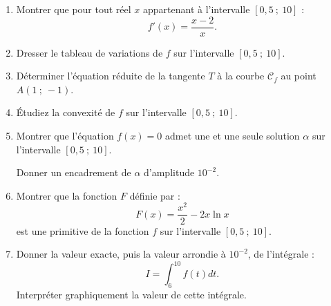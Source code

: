 \begin{enumerate}
     \item %
     Montrer que pour tout réel $x$ appartenant à l'intervalle $[0,5~;~10]$ :
     \[ f'(x) =\dfrac{x-2}{x}. \]
     \item %
     Dresser le tableau de variations de $f$ sur l'intervalle $[0,5~;~10]$.
     \item %
     Déterminer l'équation réduite de la tangente $T$ à la courbe $\mathscr{C}_f$ au point $A(1~;~-1)$.
     \item %
     \'Etudiez la convexité de $f$ sur l'intervalle $[0,5~;~10]$.
     \item %
     Montrer que l'équation $f(x)=0$ admet une et une seule solution $\alpha$ sur l'intervalle $[0,5~;~10]$.
     \par
     Donner un encadrement de $\alpha$ d'amplitude $10^{-2}$.
     \item %
     Montrer que la fonction $F$ définie par :
     \[ F(x)=\dfrac{x^2}{2} - 2x\ln x \]
     est une primitive de la fonction $f$ sur l'intervalle $[0,5~;~10]$.
     \item %
     Donner la valeur exacte, puis la valeur arrondie à $10^{-2}$, de l'intégrale :
     \[ I=\displaystyle\int_{6}^{10} f(t)dt. \]
     Interpréter graphiquement la valeur de cette intégrale.
     \par
\end{enumerate}
